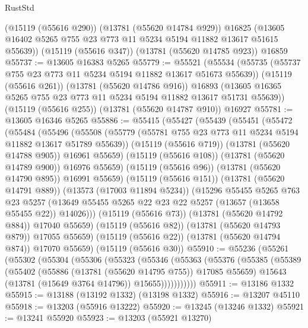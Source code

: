 \begin{lexlean}{RustStd}
\begin{coremodule}
      (@15119 (@55616 @290))
      (@13781 (@55620 @14784 @929))
      @16825
      (@13605 @16402 @5265 @755 @23 @773 @11 @5234 @5194 @11882 @13617 @51615 @55639))
    (@15119 (@55616 @347))
    (@13781 (@55620 @14785 @923))
    @16859
@55737 := @13605 @16383 @5265
@55779 := @55521
    (@55534
      (@55735 (@55737 @755 @23 @773 @11 @5234 @5194 @11882 @13617 @51673 @55639))
      (@15119 (@55616 @261))
      (@13781 (@55620 @14786 @916))
      @16893
      (@13605 @16365 @5265 @755 @23 @773 @11 @5234 @5194 @11882 @13617 @51731 @55639))
    (@15119 (@55616 @255))
    (@13781 (@55620 @14787 @910))
    @16927
@55781 := @13605 @16346 @5265
@55886 := @55415
    (@55427
      (@55439
        (@55451
          (@55472
            (@55484
              (@55496
                (@55508
                  (@55779 (@55781 @755 @23 @773 @11 @5234 @5194 @11882 @13617 @51789 @55639))
                  (@15119 (@55616 @719))
                  (@13781 (@55620 @14788 @905))
                  @16961
                  @55659)
                (@15119 (@55616 @108))
                (@13781 (@55620 @14789 @900))
                @16976
                @55659)
              (@15119 (@55616 @96))
              (@13781 (@55620 @14790 @895))
              @16991
              @55659)
            (@15119 (@55616 @151))
            (@13781 (@55620 @14791 @889))
            (@13573 (@17003 @11894 @5234))
            (@15296
              @55455
              @5265
              @763
              @23
              @5257
              (@13649 @55455 @5265 @22 @23 @22 @5257 (@13657 (@13658 @55455 @22)) @14026)))
          (@15119 (@55616 @73))
          (@13781 (@55620 @14792 @884))
          @17040
          @55659)
        (@15119 (@55616 @82))
        (@13781 (@55620 @14793 @879))
        @17055
        @55659)
      (@15119 (@55616 @22))
      (@13781 (@55620 @14794 @874))
      @17070
      @55659)
    (@15119 (@55616 @30))
@55910 := @55236
    (@55261
      (@55302
        (@55304
          (@55306
            (@55323
              (@55346
                (@55363
                  (@55376
                    (@55385
                      (@55389
                        (@55402
                          (@55886 (@13781 (@55620 @14795 @755)) @17085 @55659)
                          @15643
                          (@13781 (@15649 @3764 @14796))
                          @15655)))))))))))
@55911 := @13186 @1332
@55915 := @13188 (@13192 @1332) (@13198 @1332)
@55916 := @13207 @45110
@55918 := @13203 (@55916 @13222)
@55920 := @13245 (@13246 @1332)
@55921 := @13241 @55920
@55923 := @13203 (@55921 @13270)

\end{coremodule}
\end{lexlean}
